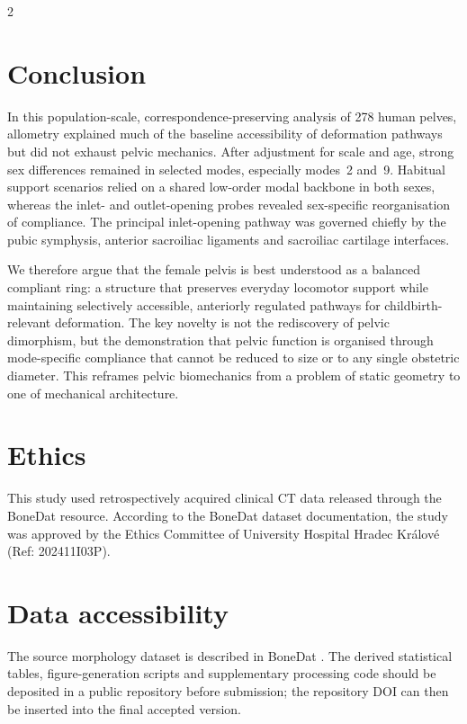 \documentclass[openacc]{rsproca_new}
\begin{document}
\begin{multicols}{2}
\section{Conclusion}

In this population-scale, correspondence-preserving analysis of 278 human pelves, allometry explained much of the baseline accessibility of deformation pathways but did not exhaust pelvic mechanics. After adjustment for scale and age, strong sex differences remained in selected modes, especially modes~2 and~9. Habitual support scenarios relied on a shared low-order modal backbone in both sexes, whereas the inlet- and outlet-opening probes revealed sex-specific reorganisation of compliance. The principal inlet-opening pathway was governed chiefly by the pubic symphysis, anterior sacroiliac ligaments and sacroiliac cartilage interfaces.

We therefore argue that the female pelvis is best understood as a balanced compliant ring: a structure that preserves everyday locomotor support while maintaining selectively accessible, anteriorly regulated pathways for childbirth-relevant deformation. The key novelty is not the rediscovery of pelvic dimorphism, but the demonstration that pelvic function is organised through mode-specific compliance that cannot be reduced to size or to any single obstetric diameter. This reframes pelvic biomechanics from a problem of static geometry to one of mechanical architecture.

\section*{Ethics}

This study used retrospectively acquired clinical CT data released through the BoneDat resource. According to the BoneDat dataset documentation, the study was approved by the Ethics Committee of University Hospital Hradec Kr\'{a}lov\'{e} (Ref: 202411I03P).

\section*{Data accessibility}

The source morphology dataset is described in BoneDat \cite{HenysKuchar2025}. The derived statistical tables, figure-generation scripts and supplementary processing code should be deposited in a public repository before submission; the repository DOI can then be inserted into the final accepted version.


\end{multicols}
\end{document}
